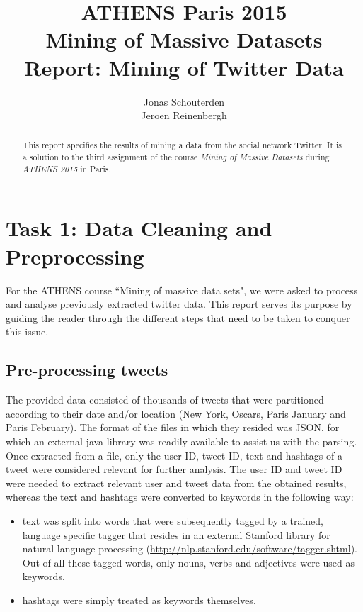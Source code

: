 \documentclass[10pt,a4paper]{article}
\author{Jonas Schouterden\\
Jeroen Reinenbergh}
\title{ATHENS Paris 2015\\
Mining of Massive Datasets\\
Report: Mining of Twitter Data}
\begin{document}
\maketitle
\begin{abstract}
This report specifies the results of mining a data from the social network Twitter. It is a solution to the third assignment of the course \emph{Mining of Massive Datasets} during \emph{ATHENS 2015} in Paris.
\end{abstract}

\section{Task 1: Data Cleaning and Preprocessing}
For the ATHENS course ``Mining of massive data sets", we were asked to process and analyse previously extracted twitter data. This report serves its purpose by guiding the reader through the different steps that need to be taken to conquer this issue. 
\subsection{Pre-processing tweets}
The provided data consisted of thousands of tweets that were partitioned according to their date and/or location (New York, Oscars, Paris January and Paris February). The format of the files in which they resided was JSON, for which an external java library was readily available to assist us with the parsing.\\

Once extracted from a file, only the user ID, tweet ID, text and hashtags of a tweet were considered relevant for further analysis. The user ID and tweet ID were needed to extract relevant user and tweet data from the obtained results, whereas the text and hashtags were converted to keywords in the following way:
\begin{itemize}
\item text was split into words that were subsequently tagged by a trained, language specific tagger that resides in an external Stanford library for natural language processing (\url{http://nlp.stanford.edu/software/tagger.shtml}). Out of all these tagged words, only nouns, verbs and adjectives were used as keywords.
\item hashtags were simply treated as keywords themselves.
\end{itemize}
\end{document}
